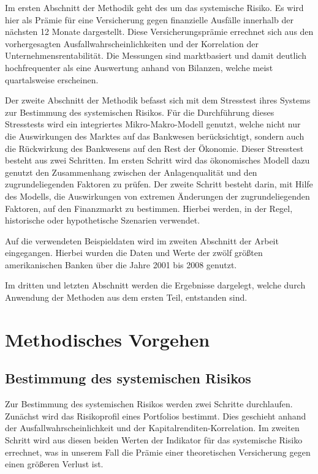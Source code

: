 \documentclass[a4paper,12pt]{scrartcl}
\begin{document}
Im ersten Abschnitt der Methodik geht des um das systemische Risiko. Es wird hier als Prämie für eine Versicherung gegen finanzielle Ausfälle innerhalb der nächsten 12 Monate dargestellt. Diese Versicherungsprämie errechnet sich aus den vorhergesagten Ausfallwahrscheinlichkeiten und der Korrelation der Unternehmensrentabilität. Die Messungen sind marktbasiert und damit deutlich hochfrequenter als eine Auswertung anhand von Bilanzen, welche meist quartalsweise erscheinen. 

Der zweite Abschnitt der Methodik befasst sich mit dem Stresstest ihres Systems zur Bestimmung des systemischen Risikos. Für die Durchführung dieses Stresstests wird ein integriertes Mikro-Makro-Modell genutzt, welche nicht nur die Auswirkungen des Marktes auf das Bankwesen berücksichtigt, sondern auch die Rückwirkung des Bankwesens auf den Rest der Ökonomie. Dieser Stresstest besteht aus zwei Schritten. Im ersten Schritt wird das ökonomisches Modell dazu genutzt den Zusammenhang zwischen der Anlagenqualität und den zugrundeliegenden Faktoren zu prüfen. Der zweite Schritt besteht darin, mit Hilfe des Modells, die Auswirkungen von extremen Änderungen der zugrundeliegenden Faktoren, auf den Finanzmarkt zu bestimmen. Hierbei werden, in der Regel, historische oder hypothetische Szenarien verwendet.

Auf die verwendeten Beispieldaten wird im zweiten Abschnitt der Arbeit eingegangen. Hierbei wurden die Daten und Werte der zwölf größten amerikanischen Banken über die Jahre 2001 bis 2008 genutzt.

Im dritten und letzten Abschnitt werden die Ergebnisse dargelegt, welche durch Anwendung der Methoden aus dem ersten Teil, entstanden sind. 
\newpage

\section{Methodisches Vorgehen}
\subsection{Bestimmung des systemischen Risikos}
Zur Bestimmung des systemischen Risikos werden zwei Schritte durchlaufen. Zunächst wird das Risikoprofil eines Portfolios bestimmt. Dies geschieht anhand der Ausfallwahrscheinlichkeit und der Kapitalrenditen-Korrelation.
Im zweiten Schritt wird aus diesen beiden Werten der Indikator für das systemische Risiko errechnet, was in unserem Fall die Prämie einer theoretischen Versicherung gegen einen größeren Verlust ist.
\end{document}
